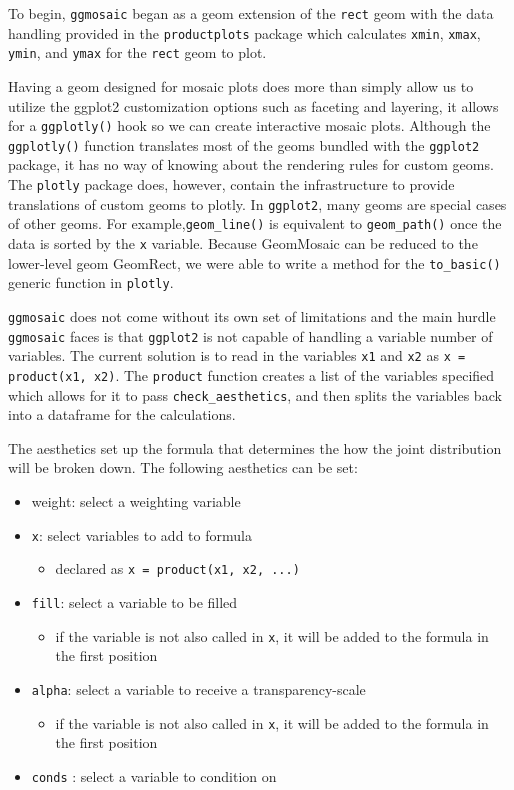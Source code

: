 To begin, \texttt{ggmosaic} began as a geom extension of the
\texttt{rect} geom with the data handling provided in the
\texttt{productplots} package which calculates \texttt{xmin},
\texttt{xmax}, \texttt{ymin}, and \texttt{ymax} for the \texttt{rect}
geom to plot.

Having a geom designed for mosaic plots does more than simply allow us
to utilize the ggplot2 customization options such as faceting and
layering, it allows for a \texttt{ggplotly()} hook so we can create
interactive mosaic plots. Although the \texttt{ggplotly()} function
translates most of the geoms bundled with the \texttt{ggplot2} package,
it has no way of knowing about the rendering rules for custom geoms. The
\texttt{plotly} package does, however, contain the infrastructure to
provide translations of custom geoms to plotly. In \texttt{ggplot2},
many geoms are special cases of other geoms. For
example,\texttt{geom\_line()} is equivalent to \texttt{geom\_path()}
once the data is sorted by the \texttt{x} variable. \citet{carson}
Because GeomMosaic can be reduced to the lower-level geom GeomRect, we
were able to write a method for the \texttt{to\_basic()} generic
function in \texttt{plotly}.

\texttt{ggmosaic} does not come without its own set of limitations and
the main hurdle \texttt{ggmosaic} faces is that \texttt{ggplot2} is not
capable of handling a variable number of variables. The current solution
is to read in the variables \texttt{x1} and \texttt{x2} as
\texttt{x = product(x1, x2)}. The \texttt{product} function creates a
list of the variables specified which allows for it to pass
\texttt{check\_aesthetics}, and then splits the variables back into a
dataframe for the calculations.

The aesthetics set up the formula that determines the how the joint
distribution will be broken down. The following aesthetics can be set:

\begin{itemize}
\item weight: select a weighting variable
\item \texttt{x}: select variables to add to formula
    \begin{itemize}
    \item declared as \texttt{x = product(x1, x2, ...)}
    \end{itemize}
\item \texttt{fill}: select a variable to be filled
    \begin{itemize}
    \item if the variable is not also called in \texttt{x}, it will be added to the formula in the first position
    \end{itemize}
\item \texttt{alpha}: select a variable to receive a transparency-scale
    \begin{itemize}
    \item if the variable is not also called in \texttt{x}, it will be added to the formula in the first position
    \end{itemize}    
\item \texttt{conds} : select a variable to condition on
\end{itemize}

